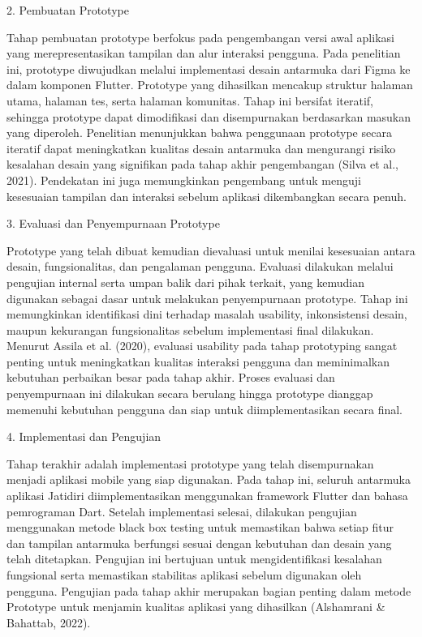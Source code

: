2. Pembuatan Prototype

Tahap pembuatan prototype berfokus pada pengembangan versi awal aplikasi yang merepresentasikan tampilan dan alur interaksi pengguna. Pada penelitian ini, prototype diwujudkan melalui implementasi desain antarmuka dari Figma ke dalam komponen Flutter. Prototype yang dihasilkan mencakup struktur halaman utama, halaman tes, serta halaman komunitas. Tahap ini bersifat iteratif, sehingga prototype dapat dimodifikasi dan disempurnakan berdasarkan masukan yang diperoleh. Penelitian menunjukkan bahwa penggunaan prototype secara iteratif dapat meningkatkan kualitas desain antarmuka dan mengurangi risiko kesalahan desain yang signifikan pada tahap akhir pengembangan (Silva et al., 2021). Pendekatan ini juga memungkinkan pengembang untuk menguji kesesuaian tampilan dan interaksi sebelum aplikasi dikembangkan secara penuh.


3. Evaluasi dan Penyempurnaan Prototype

Prototype yang telah dibuat kemudian dievaluasi untuk menilai kesesuaian antara desain, fungsionalitas, dan pengalaman pengguna. Evaluasi dilakukan melalui pengujian internal serta umpan balik dari pihak terkait, yang kemudian digunakan sebagai dasar untuk melakukan penyempurnaan prototype. Tahap ini memungkinkan identifikasi dini terhadap masalah usability, inkonsistensi desain, maupun kekurangan fungsionalitas sebelum implementasi final dilakukan. Menurut Assila et al. (2020), evaluasi usability pada tahap prototyping sangat penting untuk meningkatkan kualitas interaksi pengguna dan meminimalkan kebutuhan perbaikan besar pada tahap akhir. Proses evaluasi dan penyempurnaan ini dilakukan secara berulang hingga prototype dianggap memenuhi kebutuhan pengguna dan siap untuk diimplementasikan secara final.


4. Implementasi dan Pengujian

Tahap terakhir adalah implementasi prototype yang telah disempurnakan menjadi aplikasi mobile yang siap digunakan. Pada tahap ini, seluruh antarmuka aplikasi Jatidiri diimplementasikan menggunakan framework Flutter dan bahasa pemrograman Dart. Setelah implementasi selesai, dilakukan pengujian menggunakan metode black box testing untuk memastikan bahwa setiap fitur dan tampilan antarmuka berfungsi sesuai dengan kebutuhan dan desain yang telah ditetapkan. Pengujian ini bertujuan untuk mengidentifikasi kesalahan fungsional serta memastikan stabilitas aplikasi sebelum digunakan oleh pengguna. Pengujian pada tahap akhir merupakan bagian penting dalam metode Prototype untuk menjamin kualitas aplikasi yang dihasilkan (Alshamrani \& Bahattab, 2022).


